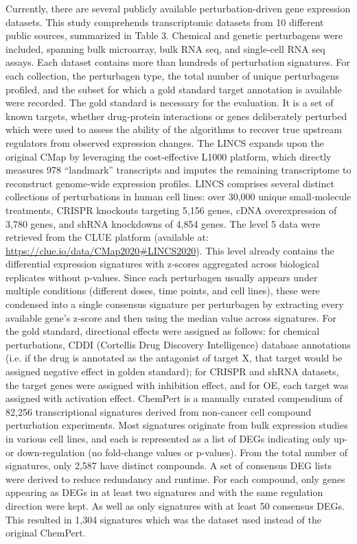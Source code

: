 Currently, there are several publicly available perturbation-driven gene expression datasets. This study comprehends transcriptomic datasets from 10 different public sources, summarized in Table 3. Chemical and genetic perturbagens were included, spanning bulk microarray, bulk RNA seq, and single-cell RNA seq assays. Each dataset contains more than hundreds of perturbation signatures. For each collection, the perturbagen type, the total number of unique perturbagens profiled, and the subset for which a gold standard target annotation is available were recorded. The gold standard is necessary for the evaluation. It is a set of known targets, whether drug‐protein interactions or genes deliberately perturbed which were used to assess the ability of the algorithms to recover true upstream regulators from observed expression changes. 
The LINCS expands upon the original CMap by leveraging the cost-effective L1000 platform, which directly measures 978 “landmark” transcripts and imputes the remaining transcriptome to reconstruct genome‐wide expression profiles. LINCS comprises several distinct collections of perturbations in human cell lines: over 30,000 unique small‐molecule treatments, CRISPR knockouts targeting 5,156 genes, cDNA overexpression of 3,780 genes, and shRNA knockdowns of 4,854 genes. The level 5 data were retrieved from the CLUE platform (available at: \url{https://clue.io/data/CMap2020#LINCS2020}). This level already contains the differential expression signatures with z‐scores aggregated across biological replicates without p‐values. Since each perturbagen usually appears under multiple conditions (different doses, time points, and cell lines), these were condensed into a single consensus signature per perturbagen by extracting every available gene’s z‐score and then using the median value across signatures. For the gold standard, directional effects were assigned as follows: for chemical perturbations, CDDI (Cortellis Drug Discovery Intelligence) database annotations (i.e. if the drug is annotated as the antagonist of target X, that target would be assigned negative effect in golden standard); for CRISPR and shRNA datasets, the target genes were assigned with inhibition effect, and for OE, each target was assigned with activation effect.
ChemPert is a manually curated compendium of 82,256 transcriptional signatures derived from non-cancer cell compound perturbation experiments. Most signatures originate from bulk expression studies in various cell lines, and each is represented as a list of DEGs indicating only up- or down-regulation (no fold-change values or p-values). From the total number of signatures, only 2,587 have distinct compounds. A set of consensus DEG lists were derived to reduce redundancy and runtime. For each compound, only genes appearing as DEGs in at least two signatures and with the same regulation direction were kept. As well as only signatures with at least 50 consensus DEGs. This resulted in 1,304 signatures which was the dataset used instead of the original ChemPert.

